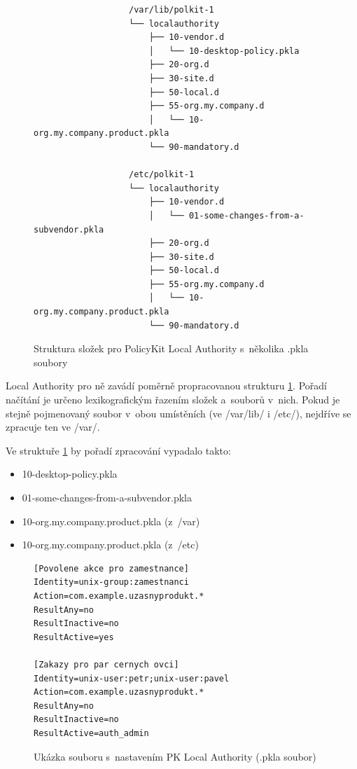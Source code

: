 \begin{figure}[h]
    \centering
    \begin{verbatim}
                   /var/lib/polkit-1
                   └── localauthority
                       ├── 10-vendor.d
                       │   └── 10-desktop-policy.pkla
                       ├── 20-org.d
                       ├── 30-site.d
                       ├── 50-local.d
                       ├── 55-org.my.company.d
                       │   └── 10-org.my.company.product.pkla
                       └── 90-mandatory.d

                   /etc/polkit-1
                   └── localauthority
                       ├── 10-vendor.d
                       │   └── 01-some-changes-from-a-subvendor.pkla
                       ├── 20-org.d
                       ├── 30-site.d
                       ├── 50-local.d
                       ├── 55-org.my.company.d
                       │   └── 10-org.my.company.product.pkla
                       └── 90-mandatory.d
    \end{verbatim}
    \caption{Struktura složek pro PolicyKit Local Authority s~několika .pkla soubory}
    \label{fig:pkit_la}
\end{figure}

Local Authority pro ně zavádí poměrně propracovanou strukturu \ref{fig:pkit_la}.
Pořadí načítání je určeno lexikografickým řazením složek a~souborů v~nich.
Pokud je stejně pojmenovaný soubor v~obou umístěních (ve /var/lib/ i /etc/),
nejdříve se zpracuje ten ve /var/.

Ve struktuře \ref{fig:pkit_la} by pořadí zpracování vypadalo takto:
\begin{itemize}
\item 10-desktop-policy.pkla
\item 01-some-changes-from-a-subvendor.pkla
\item 10-org.my.company.product.pkla (z~/var)
\item 10-org.my.company.product.pkla (z~/etc)
\end{itemize}

\begin{figure}[h]
\centering
\begin{verbatim}
[Povolene akce pro zamestnance]
Identity=unix-group:zamestnanci
Action=com.example.uzasnyprodukt.*
ResultAny=no
ResultInactive=no
ResultActive=yes

[Zakazy pro par cernych ovci]
Identity=unix-user:petr;unix-user:pavel
Action=com.example.uzasnyprodukt.*
ResultAny=no
ResultInactive=no
ResultActive=auth_admin
\end{verbatim}
\caption{Ukázka souboru s~nastavením PK Local Authority (.pkla soubor)}
\label{fig:pkit_pkla}
\end{figure}

